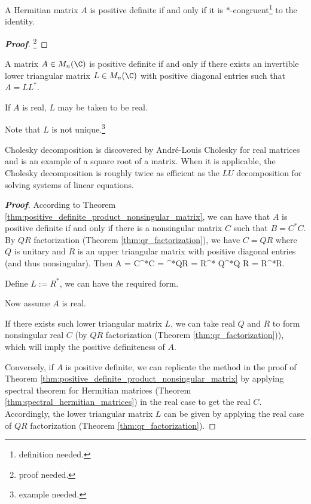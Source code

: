 \begin{corollary}
A Hermitian matrix $A$ is positive definite if and only if it is $*$-congruent\footnote{definition needed.} to the identity.
\end{corollary}

\begin{proof}[\bf Proof]
\footnote{proof needed.}
\end{proof}


\begin{corollary}\label{cor:cholesky_decomposition}
A matrix $A\in M_n(\C)$ is positive definite if and only if there exists an invertible lower triangular matrix $L \in M_n(\C)$ with positive diagonal entries such that $A = LL^*$.

If $A$ is real, $L$ may be taken to be real. 

Note that $L$ is not unique.\footnote{example needed.} %
\end{corollary}

\begin{remark}
Cholesky decomposition is discovered by Andr\'e-Louis Cholesky for real matrices and is an example of a square root of a matrix. When it is applicable, the Cholesky decomposition is roughly twice as efficient as the $LU$ decomposition for solving systems of linear equations. 
\end{remark}

\begin{proof}[\bf Proof]%
According to Theorem \ref{thm:positive_definite_product_nonsingular_matrix}, we can have that $A$ is positive definite if and only if there is a nonsingular matrix $C$ such that $B =C^*C$. By $QR$
factorization (Theorem \ref{thm:qr_factorization}), we have $C = QR$ where $Q$ is unitary and $R$ is an upper triangular matrix with positive diagonal entries (and thus nonsingular). Then
\be
A = C^*C = ^*QR = R^* Q^*Q R = R^*R.
\ee

Define $L := R^*$, we can have the required form.

Now assume $A$ is real.

If there exists such lower triangular matrix $L$, we can take real $Q$ and $R$ to form nonsingular real $C$ (by $QR$ factorization (Theorem \ref{thm:qr_factorization})), which will imply the
positive definiteness of $A$.

Conversely, if $A$ is positive definite, we can replicate the method in the proof of Theorem \ref{thm:positive_definite_product_nonsingular_matrix} by applying spectral theorem for Hermitian
matrices (Theorem \ref{thm:spectral_hermitian_matrices}) in the real case to get the real $C$. Accordingly, the lower triangular matrix $L$ can be given by applying the real case of $QR$
factorization (Theorem \ref{thm:qr_factorization}).
\end{proof}


